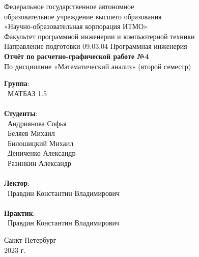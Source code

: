 \documentclass{article}
\begin{document}
\thispagestyle{empty}
\begin{center}
        \Large
        Федеральное государственное автономное \\
        образовательное учреждение высшего образования \\ 
        «Научно-образовательная корпорация ИТМО»\\
        \vspace{0.5cm}
        \large
        Факультет программной инженерии и компьютерной техники \\
        Направление подготовки 09.03.04 Программная инженерия \\
        \vspace{1cm}
        \Large
        \textbf{Отчёт по расчетно-графической работе №4} \\
        По дисциплине «Математический анализ» (второй семестр)\\
        \large
        \vspace{8cm}
    
        \begin{minipage}{.33\textwidth}
        \end{minipage}
        \hfill
        \begin{minipage}{.4\textwidth}
            \textbf{Группа}: \vspace{.1cm} \\
            \ МАТБАЗ 1.5\\ \\
            \textbf{Студенты}: \vspace{.1cm} \\
            \ Андриянова Софья\\
            \ Беляев Михаил\\
            \ Билошицкий Михаил\\
            \ Дениченко Александр\\
            \ Разинкин Александр\\ \\
            \textbf{Лектор}: \vspace{.1cm} \\
            \ Правдин Константин Владимирович \\ \\
            \textbf{Практик}:  \\
            \ Правдин Константин Владимирович
        \end{minipage}
        \vfill
    Санкт-Петербург\\ 2023 г.
    \end{center}
 
\end{document}
